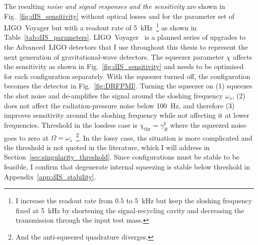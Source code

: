 The resulting \emph{noise and signal responses and the sensitivity} are shown in Fig.~\ref{fig:dIS_sensitivity} without optical losses and for the parameter set of LIGO~Voyager but with a readout rate of 5~kHz~\footnote{I increase the readout rate from $0.5$ to 5~kHz but keep the sloshing frequency fixed at 5~kHz by shortening the signal-recycling cavity and decreasing the transmission through the input test mass.} as shown in Table~\ref{tab:dIS_parameters}.
LIGO~Voyager~\cite{LIGO_Voyager} is a planned series of upgrades to the Advanced~LIGO detectors that I use throughout this thesis to represent the next generation of gravitational-wave detectors. %
The squeezer parameter $\chi$ affects the sensitivity as shown in Fig.~\ref{fig:dIS_sensitivity} and needs to be optimised for each configuration separately. With the squeezer turned off, the configuration becomes the detector in Fig.~\ref{fig:DRFPMI}. %
Turning the squeezer on (1) squeezes the shot noise and de-amplifies the signal around the sloshing frequency $\omega_s$, (2) does not affect the radiation-pressure noise below 100~Hz, and therefore (3) improves sensitivity around the sloshing frequency while not affecting it at lower frequencies. 
Threshold in the lossless case is $\chi_\text{thr}=\gamma^b_R$ where the squeezed noise goes to zero at $\Omega=\omega_s$~\footnote{And the anti-squeezed quadrature diverges.}. In the lossy case, the situation is more complicated and the threshold is not quoted in the literature, which I will address in Section~\ref{sec:singularity_threshold}. Since configurations must be stable to be feasible, I confirm that degenerate internal squeezing is stable below threshold in Appendix~\ref{app:dIS_stability}.
